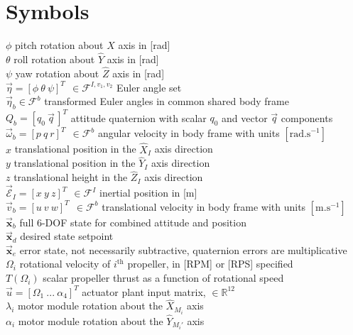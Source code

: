 \documentclass[a4paper, 11pt, oneside, openright, parskip=full]{book}
\begin{document}
\chapter{Symbols}
\label{ch:symbol}
$\phi$ pitch rotation about $\hat{X}$ axis in [rad] \\
$\theta$ roll rotation about $\hat{Y}$ axis in [rad] \\
$\psi$ yaw rotation about $\hat{Z}$ axis in [rad]\\
$\vec{\eta}=[\phi~\theta~\psi]^T~~\in\mathcal{F}^{I,v_1,v_2}$ Euler angle set\\
$\vec{\eta}_b \in\mathcal{F}^b$ transformed Euler angles in common shared body frame\\
$Q_b=[q_0~\vec{q}\hspace{2pt}]^T$ attitude quaternion with scalar $q_0$ and vector $\vec{q}$ components\\
$\vec{\omega}_b=[p~q~r]^T~~\in\mathcal{F}^b$ angular velocity in body frame with units $[\text{rad.s}^{-1}]$\\
$x$ translational position in the $\hat{X}_I$ axis direction\\
$y$ translational position in the $\hat{Y}_I$ axis direction\\
$z$ translational height in the $\hat{Z}_I$ axis direction\\
$\vec{\mathcal{E}}_I=[x~y~z]^T~~\in\mathcal{F}^{I}$ inertial position in [m]\\
$\vec{v}_b=[u~v~w]^T~~\in\mathcal{F}^b$ translational velocity in body frame with units $[\text{m.s}^{-1}]$\\
$\vec{\mathbf{x}}_b$ full 6-DOF state for combined attitude and position\\
$\vec{\mathbf{x}}_d$ desired state setpoint\\
$\vec{\mathbf{x}}_e$ error state, not necessarily subtractive, quaternion errors are multiplicative\\
$\Omega_i$ rotational velocity of $i^{\text{th}}$ propeller, in [RPM] or [RPS] specified\\
$T(\Omega_i)$ scalar propeller thrust as a function of rotational speed\\
$\vec{u}=[\Omega_1~...~\alpha_4]^T$ actuator plant input matrix, $\in\mathbb{R}^{12}$\\
$\lambda_i$ motor module rotation about the $\hat{X}_{M_i}$ axis\\
$\alpha_i$ motor module rotation about the $\hat{Y}_{M_i'}$ axis\\
\end{document}
